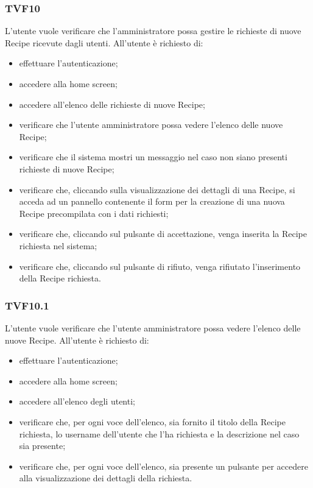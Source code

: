 		\subsubsection{TVF10}
			L'utente vuole verificare che l'amministratore possa gestire le richieste di nuove Recipe ricevute dagli utenti. All'utente è richiesto di:
			\begin{itemize}
				\item effettuare l'autenticazione;
				\item accedere alla home screen;
				\item accedere all'elenco delle richieste di nuove Recipe;
				\item verificare che l'utente amministratore possa vedere l'elenco delle nuove Recipe;
				\item verificare che il sistema mostri un messaggio nel caso non siano presenti richieste di nuove Recipe;
				\item verificare che, cliccando sulla visualizzazione dei dettagli di una Recipe, si acceda ad un pannello contenente il form per la creazione di una nuova Recipe precompilata con i dati richiesti;
				\item verificare che, cliccando sul pulsante di accettazione, venga inserita la Recipe richiesta nel sistema;
				\item verificare che, cliccando sul pulsante di rifiuto, venga rifiutato l'inserimento della Recipe richiesta.
			\end{itemize}
			
		\subsubsection{TVF10.1}
			L'utente vuole verificare che l'utente amministratore possa vedere l'elenco delle nuove Recipe. All'utente è richiesto di:
			\begin{itemize}
				\item effettuare l'autenticazione;
				\item accedere alla home screen;
				\item accedere all'elenco degli utenti;
				\item verificare che, per ogni voce dell'elenco, sia fornito il titolo della Recipe richiesta, lo username dell'utente che l'ha richiesta e la descrizione nel caso sia presente;
				\item verificare che, per ogni voce dell'elenco, sia presente un pulsante per accedere alla visualizzazione dei dettagli della richiesta.
			\end{itemize}
			
